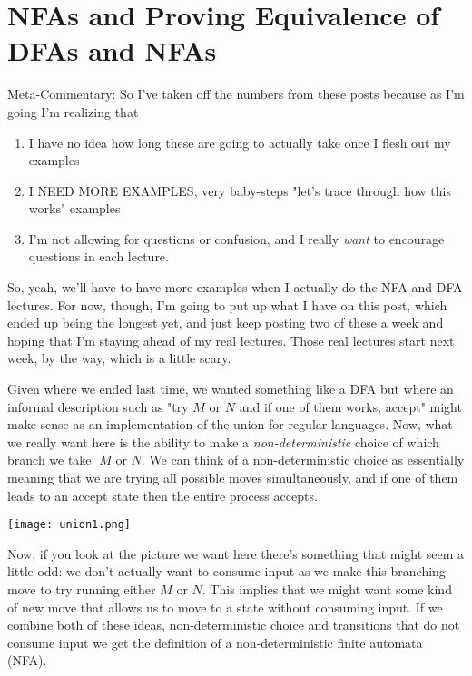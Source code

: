 \documentclass[11pt]{article}
\begin{document}
\section{NFAs and Proving Equivalence of DFAs and NFAs}
\label{sec-3}
Meta-Commentary: So I've taken off the numbers from these posts because as I'm going I'm realizing that 
\begin{enumerate}
\item I have no idea how long these are going to actually take once I flesh out my examples
\item I NEED MORE EXAMPLES, very baby-steps "let's trace through how this works" examples
\item I'm not allowing for questions or confusion, and I really \emph{want} to encourage questions in each lecture.
\end{enumerate}

So, yeah, we'll have to have more examples when I actually do the NFA and DFA lectures. For now, though, I'm going to put up what I have on this post, which ended up being the longest yet, and just keep posting two of these a week and hoping that I'm staying ahead of my real lectures. Those real lectures start next week, by the way, which is a little scary.

Given where we ended last time, we wanted something like a DFA but where an informal description such as "try $M$ or $N$ and if one of them works, accept" might make sense as an implementation of the union for regular languages. Now, what we really want here is the ability to make a \emph{non-deterministic} choice of which branch we take: $M$ or $N$. We can think of a non-deterministic choice as essentially meaning that we are trying all possible moves simultaneously, and if one of them leads to an accept state then the entire process accepts.

\texttt{[image: union1.png]}

Now, if you look at the picture we want here there's something that might seem a little odd: we don't actually want to consume input as we make this branching move to try running either $M$ or $N$. This implies that we might want some kind of new move that allows us to move to a state without consuming input. If we combine both of these ideas, non-deterministic choice and transitions that do not consume input we get the definition of a non-deterministic finite automata (NFA). 
\end{document}
